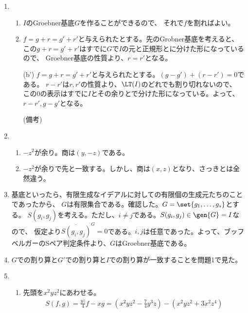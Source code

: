 \begin{enumerate}[label=(問題 \arabic*)]
  \item
  \begin{enumerate}[label=(\alph*)]
    \item $I$のGroebner基底$G$を作ることができるので、
    それで$f$を割ればよい。
    \item $f=g+r=g'+r'$と与えられたとする。先のGrobner基底を考えると、
    この$g+r=g'+r'$はすでに$G$で$I$の元と正規形とに分けた形になっているので、
    Groebner基底の性質より、$r=r'$となる。
    \item[(b')] $f=g+r=g'+r'$と与えられたとする。$(g-g')+(r-r') = 0$である。
    $r-r'$は$r,r'$の性質より、$\LT(I)$のどれでも割り切れないので、
    この$0$の表示はすでに$I$とその余りとで分けた形になっている。よって、
    $r-r',g-g'$となる。
    \item[(備考)] 
  \end{enumerate}
  \item
  \begin{enumerate}[label=(\alph*)]
    \item
    $-z^2$が余り。商は$(y,-z)$である。
    \item
    $-z^2$が余りで先と一致する。しかし、商は$(x,z)$となり、さっきとは全然違う。
  \end{enumerate}
  \item
  基底といったら、有限生成なイデアルに対しての有限個の生成元たちのことであったから、
  $G$は有限集合である。確認した。$G=\set{g_1,\dots,g_s}$とする。
  $S(g_i,g_j)$を考える。ただし、$i\neq j$である。$S(g_i,g_j)\in \gen{G} = I$なので、
  仮定より$\overline{S(g_i,g_j)}^G = 0$である。$i,j$は任意であった。よって、ブッフベルガーのSペア判定条件より、$G$はGroebner基底である。
  \item
  $G$での割り算と$G'$での割り算と$I$での割り算が一致することを問題1で見た。
  \item
  \begin{enumerate}[label=(\alph*)]
    \item 先頭を$x^2yz^2$にあわせる。
    \begin{align}
      S(f,g)
      =
      \frac{yz}{4}f - xg
      =
      (x^2yz^2 - \frac{7}{4}y^3z) - (x^2yz^2 + 3x^2z^4)

\end{align}
\end{enumerate}
\end{enumerate}
